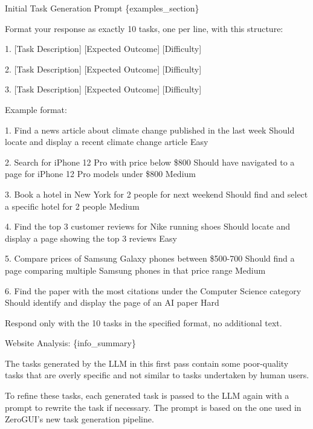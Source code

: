 \documentclass{article} %
\begin{document}
\begin{fancybox}{Initial Task Generation Prompt}
\{examples\_section\}

\bigskip
Format your response as exactly 10 tasks, one per line, with this structure:

1. [Task Description] \textbar{} [Expected Outcome] \textbar{} [Difficulty]

2. [Task Description] \textbar{} [Expected Outcome] \textbar{} [Difficulty]

3. [Task Description] \textbar{} [Expected Outcome] \textbar{} [Difficulty]

\bigskip
Example format:

1. Find a news article about climate change published in the last week \textbar{} Should locate and display a recent climate change article \textbar{} Easy

2. Search for iPhone 12 Pro with price below \$800 \textbar{} Should have navigated to a page for iPhone 12 Pro models under \$800 \textbar{} Medium

3. Book a hotel in New York for 2 people for next weekend \textbar{} Should find and select a specific hotel for 2 people \textbar{} Medium

4. Find the top 3 customer reviews for Nike running shoes \textbar{} Should locate and display a page showing the top 3 reviews \textbar{} Easy

5. Compare prices of Samsung Galaxy phones between \$500-700 \textbar{} Should find a page comparing multiple Samsung phones in that price range \textbar{} Medium

6. Find the paper with the most citations under the Computer Science category \textbar{} Should identify and display the page of an AI paper \textbar{} Hard

\bigskip
Respond only with the 10 tasks in the specified format, no additional text.

\bigskip
Website Analysis: \{info\_summary\}
\end{fancybox}

The tasks generated by the LLM in this first pass contain some poor-quality tasks that are overly specific and not similar to tasks undertaken by human users.

To refine these tasks, each generated task is passed to the LLM again with a prompt to rewrite the task if necessary. The prompt is based on the one used in ZeroGUI's \citep{ZeroGUI} new task generation pipeline.
\end{document}
